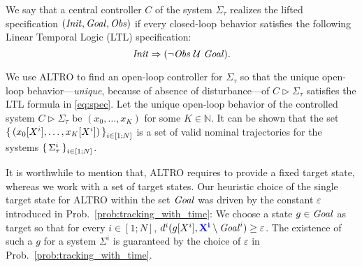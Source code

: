 We say that a central controller $C$ of the system $\Sigma_\tau$ realizes the lifted specification $(\mathit{Init},\mathit{Goal},\mathit{Obs})$ if every closed-loop behavior satisfies the following Linear Temporal Logic (LTL) specification:
\begin{equation}\label{eq:spec}
	\mathit{Init} \Rightarrow (\lnot \mathit{Obs} \ \mathcal{U}\ \mathit{Goal}).
\end{equation} 

We use ALTRO to find an open-loop controller for $\Sigma_\tau$ so that the unique open-loop behavior---\emph{unique}, because of absence of disturbance---of $C \triangleright\Sigma_\tau$ satisfies the LTL formula in \eqref{eq:spec}.
Let the unique open-loop behavior of the controlled system $C \triangleright\Sigma_\tau$ be $(x_0,\ldots,x_K)$ for some $K\in \mathbb{N}$.
It can be shown that the set $\set{(x_0[X^i],\ldots,x_K[X^i])}_{i\in [1;N]}$ is a set of valid nominal trajectories for the systems $\set{\Sigma^i_\tau}_{i\in [1;N]}$.

It is worthwhile to mention that, ALTRO requires to provide a fixed target state, whereas we work with a set of target states.
Our heuristic choice of the single target state for ALTRO within the set $\mathit{Goal}$ was driven by the constant $\varepsilon$ introduced in Prob.~\ref{prob:tracking_with_time}:
We choose a state $g\in \mathit{Goal}$ as target so that for every $i\in [1;N]$, $d^i(g[X^i], {\color{blue} \mathbf{X^i}}\setminus \mathit{Goal}^i) \geq \varepsilon$.
The existence of such a $g$ for a system $\Sigma^i$ is guaranteed by the choice of $\varepsilon$ in Prob.~\ref{prob:tracking_with_time}. 

%
%	


